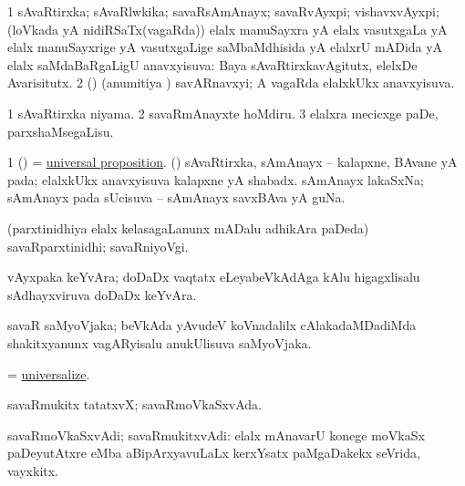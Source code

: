 \bentry
{} 
\gl{\gu}
\expl{}
\bmng
\bnum
\num{1} sAvaRtirxka; sAvaRlwkika; savaRsAmAnayx; savaRvAyxpi; vishavxvAyxpi; (loVkada yA nidiRSaTx(vagaRda)) elalx manuSayxra yA elalx vasutxgaLa yA elalx manuSayxrige yA vasutxgaLige saMbaMdhisida yA elalxrU mADida yA elalx saMdaBaRgaLigU anavxyisuva:  Baya sAvaRtirxkavAgitutx, elelxDe Avarisitutx. 
\num{2} (\takaR) (anumitiya \vi) savARnavxyi; A vagaRda elalxkUkx anavxyisuva. 
\enum
\emng

\noindent
\gl{\pagu}
\expl{}
\bmng
\bnum
\num{1}  sAvaRtirxka niyama. 
\num{2}  savaRmAnayxte hoMdiru. 
\num{3}  elalxra mecicxge paDe, parxshaMsegaLisu. 
\enum
\emng
\eentry

\bentry
{} 
\gl{\nA}
\expl{}
\bmng
\bnum
\num{1} (\takaR) = \hyperlink{universal proposition}{universal proposition}. 
 (\tashA) 
\banum
{} sAvaRtirxka, sAmAnayx -- kalapxne, BAvane yA pada; elalxkUkx anavxyisuva kalapxne yA shabadx. 
 sAmAnayx lakaSxNa; sAmAnayx pada sUcisuva -- sAmAnayx savxBAva yA guNa. 
\eanum
\numie
\enum
\emng
\eentry

\bentry
{}
\gl{\nA}
\expl{}
\bmng
(parxtinidhiya elalx kelasagaLanunx mADalu adhikAra paDeda) savaRparxtinidhi; savaRniyoVgi. 
\emng
\eentry

\bentry
{}
\gl{\nA}
\expl{}
\bmng
vAyxpaka keYvAra; doDaDx vaqtatx eLeyabeVkAdAga kAlu higagxlisalu sAdhayxviruva doDaDx keYvAra. 
\emng
\eentry

\bentry
{}
\gl{\nA}
\expl{}
\bmng
savaR saMyoVjaka; beVkAda yAvudeV koVnadalilx cAlakadaMDadiMda shakitxyanunx vagARyisalu anukUlisuva saMyoVjaka. 
\emng
\eentry

\bentry
{} 
\gl{\sakirx}
\expl{}
\bmng
= \hyperlink{universalize}{universalize}. 
\emng
\eentry

\bentry
{} 
\gl{\nA}
\expl{}
\bmng
savaRmukitx tatatxvX; savaRmoVkaSxvAda. 
\emng
\eentry

\bentry
{} 
\gl{\nA}
\expl{}
\bmng
savaRmoVkaSxvAdi; savaRmukitxvAdi: elalx mAnavarU konege moVkaSx paDeyutAtxre eMba aBipArxyavuLaLx kerxYsatx paMgaDakekx seVrida, vayxkitx. 
\emng
\eentry

